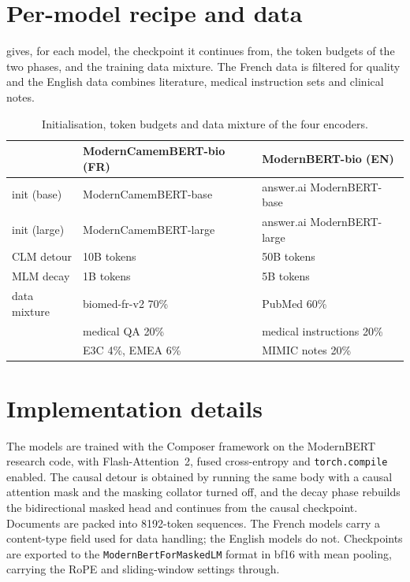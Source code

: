 \section{Per-model recipe and data}

 gives, for each model, the checkpoint it continues from,
the token budgets of the two phases, and the training data mixture. The French data
is filtered for quality and the English data combines literature, medical
instruction sets and clinical notes.

\begin{table}[t]
  \centering
  \small
  \setlength{\tabcolsep}{8pt}
  \begin{tabular}{@{}lll@{}}
    \toprule
    & ModernCamemBERT-bio (FR) & ModernBERT-bio (EN) \\
    \midrule
    init (base)   & ModernCamemBERT-base & answer.ai ModernBERT-base \\
    init (large)  & ModernCamemBERT-large & answer.ai ModernBERT-large \\
    CLM detour    & 10B tokens & 50B tokens \\
    MLM decay     & 1B tokens & 5B tokens \\
    \midrule
    data mixture  & biomed-fr-v2 70\% & PubMed 60\% \\
                  & medical QA 20\% & medical instructions 20\% \\
                  & E3C 4\%, EMEA 6\% & MIMIC notes 20\% \\
    \bottomrule
  \end{tabular}
\caption{Initialisation, token budgets and data mixture of the four encoders.}
\label{tab:clm-permodel}
\end{table}

\section{Implementation details}

The models are trained with the Composer framework on the ModernBERT research code,
with Flash-Attention~2, fused cross-entropy and \texttt{torch.compile} enabled. The
causal detour is obtained by running the same body with a causal attention mask and
the masking collator turned off, and the decay phase rebuilds the bidirectional
masked head and continues from the causal checkpoint. Documents are packed into
8192-token sequences. The French models carry a content-type field used for
data handling; the English models do not. Checkpoints are exported to the
\texttt{ModernBertForMaskedLM} format in bf16 with mean pooling, carrying the RoPE
and sliding-window settings through.

